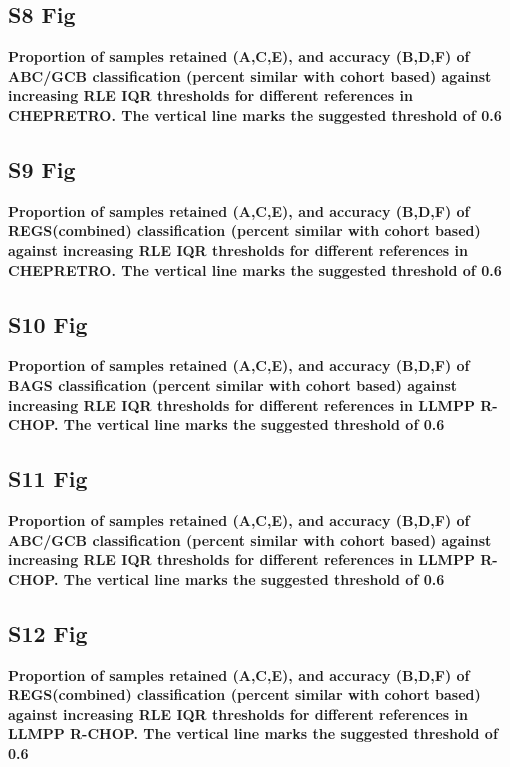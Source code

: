 \documentclass[10pt,letterpaper]{article}
\begin{document}
\subsection*{S8 Fig} \label{fig:chep_rle_clas_abcgcb}
{\bf Proportion of samples retained (A,C,E), and accuracy (B,D,F) of ABC/GCB classification (percent similar with cohort based) against increasing RLE IQR thresholds for different references in CHEPRETRO. The vertical line marks the suggested threshold of 0.6}

\subsection*{S9 Fig} \label{fig:chep_rle_clas_regs}
{\bf Proportion of samples retained (A,C,E), and accuracy (B,D,F) of REGS(combined) classification (percent similar with cohort based) against increasing RLE IQR thresholds for different references in CHEPRETRO. The vertical line marks the suggested threshold of 0.6}

\subsection*{S10 Fig} \label{fig:RCHOP_rle_clas_bags}
{\bf Proportion of samples retained (A,C,E), and accuracy (B,D,F) of BAGS classification (percent similar with cohort based) against increasing RLE IQR thresholds for different references in LLMPP R-CHOP. The vertical line marks the suggested threshold of 0.6}

\subsection*{S11 Fig} \label{fig:RCHOP_rle_clas_abcgcb}
{\bf Proportion of samples retained (A,C,E), and accuracy (B,D,F) of ABC/GCB classification (percent similar with cohort based) against increasing RLE IQR thresholds for different references in LLMPP R-CHOP. The vertical line marks the suggested threshold of 0.6}

\subsection*{S12 Fig} \label{fig:RCHOP_rle_clas_regs}
{\bf Proportion of samples retained (A,C,E), and accuracy (B,D,F) of REGS(combined) classification (percent similar with cohort based) against increasing RLE IQR thresholds for different references in LLMPP R-CHOP. The vertical line marks the suggested threshold of 0.6}
\end{document}
